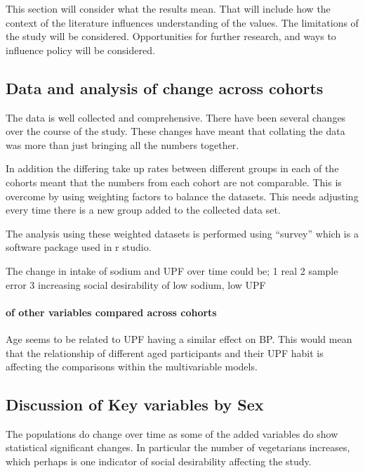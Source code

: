 \documentclass[
]{article}
\begin{document}
This section will consider what the results mean. That will include how
the context of the literature influences understanding of the values.
The limitations of the study will be considered. Opportunities for
further research, and ways to influence policy will be considered.

\hypertarget{data-and-analysis-of-change-across-cohorts}{%
\subsection{Data and analysis of change across
cohorts}\label{data-and-analysis-of-change-across-cohorts}}

The data is well collected and comprehensive. There have been several
changes over the course of the study. These changes have meant that
collating the data was more than just bringing all the numbers together.

In addition the differing take up rates between different groups in each
of the cohorts meant that the numbers from each cohort are not
comparable. This is overcome by using weighting factors to balance the
datasets. This needs adjusting every time there is a new group added to
the collected data set.

The analysis using these weighted datasets is performed using ``survey''
which is a software package used in r studio.

The change in intake of sodium and UPF over time could be; 1 real 2
sample error 3 increasing social desirability of low sodium, low UPF

\hypertarget{of-other-variables-compared-across-cohorts}{%
\paragraph{of other variables compared across
cohorts}\label{of-other-variables-compared-across-cohorts}}

Age seems to be related to UPF having a similar effect on BP. This would
mean that the relationship of different aged participants and their UPF
habit is affecting the comparisons within the multivariable models.

\hypertarget{discussion-of-key-variables-by-sex}{%
\subsection{Discussion of Key variables by
Sex}\label{discussion-of-key-variables-by-sex}}

The populations do change over time as some of the added variables do
show statistical significant changes. In particular the number of
vegetarians increases, which perhaps is one indicator of social
desirability affecting the study.
\end{document}
